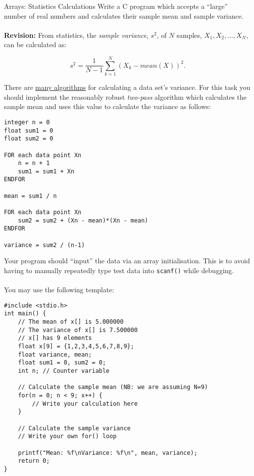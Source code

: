 \documentclass{lab}
\begin{document}
\pagebreak
\begin{task}{Arrays: Statistics Calculations}{}
Write a C program which accepts a ``large'' number of real numbers and calculates their sample mean and sample variance.
\\~\\
\textbf{Revision:} From statistics, the \textit{sample variance}, $s^2$, of $N$ samples, $X_1, X_2, ... , X_N$, can be calculated as:

\begin{equation}\label{eq:var}
s^2 = \frac{1}{N-1}\sum_{k=1}^{N}(X_k - mean(X))^2.
\end{equation}

There are \underline{\href{https://en.wikipedia.org/wiki/Algorithms_for_calculating_variance}{many algorithms}} for calculating a data set's variance. For this task you should implement the reasonably robust \textit{two-pass} algorithm which calculates the sample mean and uses this value to calculate the variance as follows:
\begin{lstlisting}[style=pseudo]
integer n = 0
float sum1 = 0
float sum2 = 0

FOR each data point Xn
	n = n + 1
	sum1 = sum1 + Xn
ENDFOR

mean = sum1 / n

FOR each data point Xn
	sum2 = sum2 + (Xn - mean)*(Xn - mean)
ENDFOR

variance = sum2 / (n-1)
\end{lstlisting}

Your program should ``input'' the data via an array initialisation. This is to avoid having to manually repeatedly type test data into \texttt{scanf()} while debugging.
\\~\\
You may use the following template:
\begin{lstlisting}[style=Ctable]
#include <stdio.h>
int main() {
	// The mean of x[] is 5.000000
	// The variance of x[] is 7.500000
	// x[] has 9 elements
	float x[9] = {1,2,3,4,5,6,7,8,9};
	float variance, mean;
	float sum1 = 0, sum2 = 0;
	int n; // Counter variable
	
	// Calculate the sample mean (NB: we are assuming N=9)
	for(n = 0; n < 9; x++) {
		// Write your calculation here
	}	
	
	// Calculate the sample variance
	// Write your own for() loop
	
	printf("Mean: %f\nVariance: %f\n", mean, variance);
	return 0;
}
\end{lstlisting}
\end{task}
\end{document}
